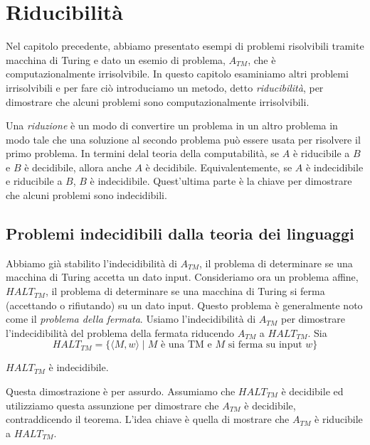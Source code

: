 \documentclass[12pt]{report}
\newcounter{theorem}
\begin{document}
\chapter{Riducibilità}
Nel capitolo precedente, abbiamo presentato esempi di problemi risolvibili tramite macchina di Turing e dato un esemio di problema, $A_{TM}$, che è computazionalmente irrisolvibile. In questo capitolo esaminiamo altri problemi irrisolvibili e per fare ciò introduciamo un metodo, detto \textit{riducibilità}, per dimostrare che alcuni problemi sono computazionalmente irrisolvibili.

Una \textit{riduzione} è un modo di convertire un problema in un altro problema in modo tale che una soluzione al secondo problema può essere usata per risolvere il primo problema. In termini delal teoria della computabilità, se $A$ è riducibile a $B$ e $B$ è decidibile, allora anche $A$ è decidibile. Equivalentemente, se $A$ è indecidibile e riducibile a $B$, $B$ è indecidibile. Quest'ultima parte è la chiave per dimostrare che alcuni problemi sono indecidibili.
\section{Problemi indecidibili dalla teoria dei linguaggi}
Abbiamo già stabilito l'indecidibilità di $A_{TM}$, il problema di determinare se una macchina di Turing accetta un dato input. Consideriamo ora un problema affine, $HALT_{TM}$, il problema di determinare se una macchina di Turing si ferma (accettando o rifiutando) su un dato input. Questo problema è generalmente noto come il \textit{problema della fermata}. Usiamo l'indecidibilità di $A_{TM}$ per dimostrare l'indecidibilità del problema della fermata riducendo $A_{TM}$ a $HALT_{TM}$. Sia
\[
HALT_{TM} = \{\langle M, w \rangle \mid M \text{ è una TM e $M$ si ferma su input $w$}\}
\]

\begin{theorem}{}{}
	$HALT_{TM}$ è indecidibile.
\end{theorem}
Questa dimostrazione è per assurdo. Assumiamo che $HALT_{TM}$ è decidibile ed utilizziamo questa assunzione per dimostrare che $A_{TM}$ è decidibile, contraddicendo il teorema. L'idea chiave è quella di mostrare che $A_{TM}$ è riducibile a $HALT_{TM}$.
\end{document}

